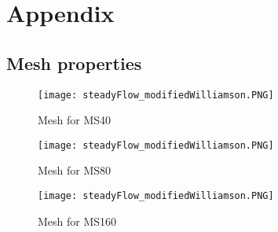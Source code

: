 \appendix
\chapter{Appendix}
\section{Mesh properties}
	\begin{figure}[htp]
		\centering
		\texttt{[image: steadyFlow\_modifiedWilliamson.PNG]}
		\caption{Mesh for MS40}
		\label{fig:ms40}
	\end{figure}
	\begin{figure}[htp]
		\centering
		\texttt{[image: steadyFlow\_modifiedWilliamson.PNG]}
		\caption{Mesh for MS80}
		\label{fig:ms80}
	\end{figure} 
	\begin{figure}[htp]
		\centering
		\texttt{[image: steadyFlow\_modifiedWilliamson.PNG]}
		\caption{Mesh for MS160}
		\label{fig:ms160}
	\end{figure}  